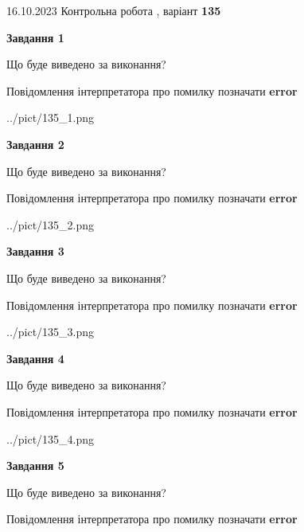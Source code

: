 \documentclass[12pt, ukrainian]{article}
\begin{document}
{\Large{16.10.2023 Контрольна робота , варіант  \No \textbf { 135 }\par}}
{
\begin {large}
{\begin {center}\textbf{Завдання 1}\end {center}}\par
Що буде виведено за виконання? \par
Повідомлення інтерпретатора про помилку позначати \textbf{error}

\begin{center}
	{../pict/135_1.png}
\end{center}
\newpage

{\begin {center}\textbf{Завдання 2}\end {center}}\par
Що буде виведено за виконання? \par
Повідомлення інтерпретатора про помилку позначати \textbf{error}

\begin{center}
	{../pict/135_2.png}
\end{center}
\newpage

{\begin {center}\textbf{Завдання 3}\end {center}}\par
Що буде виведено за виконання? \par
Повідомлення інтерпретатора про помилку позначати \textbf{error}

\begin{center}
	{../pict/135_3.png}
\end{center}
\newpage

{\begin {center}\textbf{Завдання 4}\end {center}}\par
Що буде виведено за виконання? \par
Повідомлення інтерпретатора про помилку позначати \textbf{error}

\begin{center}
	{../pict/135_4.png}
\end{center}
\newpage

{\begin {center}\textbf{Завдання 5}\end {center}}\par
Що буде виведено за виконання? \par
Повідомлення інтерпретатора про помилку позначати \textbf{error}


\end{large}}
\end{document}
